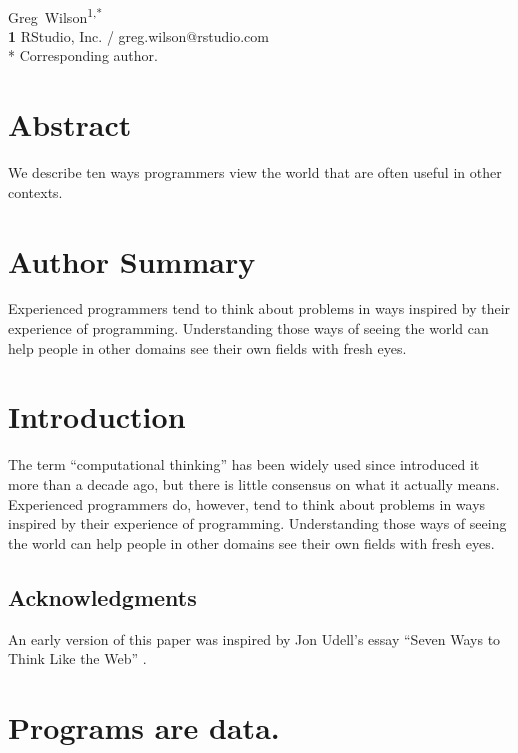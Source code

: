 \documentclass[10pt,letterpaper]{article}
\newcommand{\rulemajor}[1]{\section{#1}}
\begin{document}
\vspace*{0.2in}

\begin{flushleft}
{\Large
\textbf{}
}
\newline
\\
{Greg~Wilson}\textsuperscript{1,*}
\\
\textbf{1} RStudio, Inc. / greg.wilson@rstudio.com
\\
\bigskip
* Corresponding author.
\end{flushleft}

\section*{Abstract}

We describe ten ways programmers view the world that are often useful in other
contexts.

\section*{Author Summary}

Experienced programmers tend to think about problems in ways inspired by their
experience of programming.  Understanding those ways of seeing the world can
help people in other domains see their own fields with fresh eyes.

\section*{Introduction}

The term ``computational thinking'' has been widely used since \cite{Wing2006}
introduced it more than a decade ago, but there is little consensus on what it
actually means.  Experienced programmers do, however, tend to think about
problems in ways inspired by their experience of programming.  Understanding
those ways of seeing the world can help people in other domains see their own
fields with fresh eyes.

\subsection*{Acknowledgments}

An early version of this paper was inspired by Jon Udell's essay ``Seven Ways to
Think Like the Web'' \cite{Udel2011}.

\rulemajor{Programs are data.}
\end{document}

